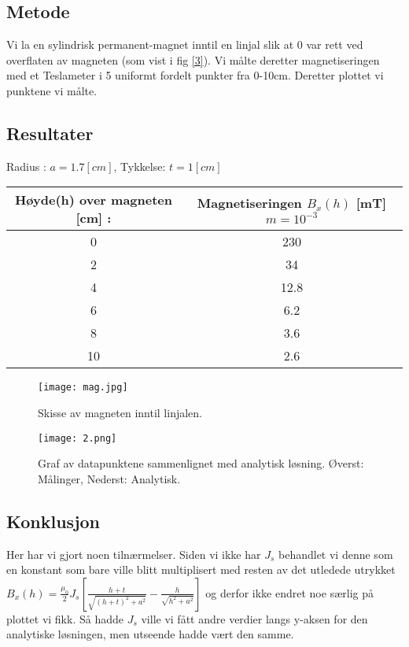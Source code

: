 \documentclass{article}
\begin{document}
\subsection{Metode}
Vi la en sylindrisk permanent-magnet inntil en linjal slik at 0 var rett ved overflaten av magneten (som vist i fig \ref{3}). Vi målte deretter magnetiseringen med et Teslameter i 5 uniformt fordelt punkter fra 0-10cm. Deretter plottet vi punktene vi målte. 

\subsection{Resultater}
Radius : $a = 1.7[cm]$, Tykkelse: $t = 1 [cm] $

\begin{center}
  \begin{tabular}{ | c | c |}
    \hline
    Høyde(h) over magneten [cm] : & Magnetiseringen $B_x(h)$ [mT] $m=10^{-3}$\\ \hline
      0 & 230 \\ \hline
      2 & 34 \\ \hline
      4 & 12.8 \\ \hline
      6 & 6.2 \\ \hline
      8 & 3.6\\ \hline
      10 & 2.6 \\
    \hline
  \end{tabular}
\end{center}

\begin{figure}[h!]
\begin{minipage}[b]{0.45\linewidth}
\centering
\texttt{[image: mag.jpg]} 
\caption{Skisse av magneten inntil linjalen.}
\label{3}
\end{minipage}
\hspace{0.5cm}
\begin{minipage}[b]{0.45\linewidth}
\centering
\texttt{[image: 2.png]} 
\caption{Graf av datapunktene sammenlignet med analytisk løsning. Øverst: Målinger, Nederst: Analytisk.}
\label{4}
\end{minipage}
\end{figure}

\subsection{Konklusjon}
Her har vi gjort noen tilnærmelser. Siden vi ikke har $J_s$ behandlet vi denne som en konstant som bare ville blitt multiplisert med resten av det utledede utrykket 
$B_x(h) = \frac{\mu_0}{2}J_s\left[\frac{h+t}{\sqrt{(h+t)^2+a^2}} - \frac{h}{\sqrt{h^2+a^2}}\right] $ og derfor ikke endret noe særlig på plottet vi fikk. Så hadde $J_s$ ville vi fått andre verdier langs y-aksen for den analytiske løsningen, men utseende hadde vært den samme. 
\end{document}
